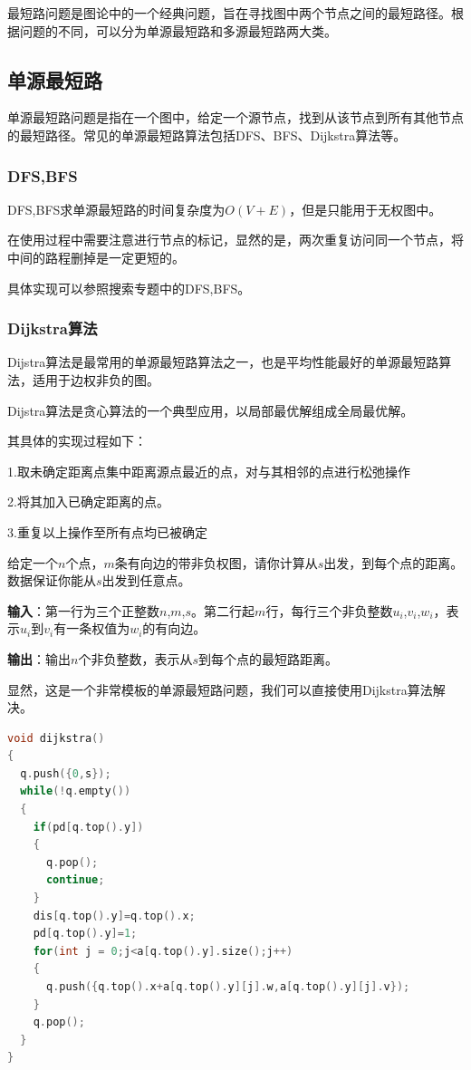 \documentclass{article}
\begin{document}
最短路问题是图论中的一个经典问题，旨在寻找图中两个节点之间的最短路径。根据问题的不同，可以分为单源最短路和多源最短路两大类。

\subsection{单源最短路}

单源最短路问题是指在一个图中，给定一个源节点，找到从该节点到所有其他节点的最短路径。常见的单源最短路算法包括DFS、BFS、Dijkstra算法等。

\subsubsection{DFS,BFS}

DFS,BFS求单源最短路的时间复杂度为$O(V+E)$，但是只能用于无权图中。

在使用过程中需要注意进行节点的标记，显然的是，两次重复访问同一个节点，将中间的路程删掉是一定更短的。

具体实现可以参照搜索专题中的DFS,BFS。

\subsubsection{Dijkstra算法}

Dijstra算法是最常用的单源最短路算法之一，也是平均性能最好的单源最短路算法，适用于边权非负的图。

Dijstra算法是贪心算法的一个典型应用，以局部最优解组成全局最优解。

其具体的实现过程如下：

1.取未确定距离点集中距离源点最近的点，对与其相邻的点进行松弛操作

2.将其加入已确定距离的点。

3.重复以上操作至所有点均已被确定

\begin{example}
  给定一个$n$个点，$m$条有向边的带非负权图，请你计算从$s$出发，到每个点的距离。数据保证你能从$s$出发到任意点。

  \textbf{输入}：第一行为三个正整数$n$,$m$,$s$。第二行起$m$行，每行三个非负整数$u_i$,$v_i$,$w_i$，表示$u_i$到$v_i$有一条权值为$w_i$的有向边。

  \textbf{输出}：输出$n$个非负整数，表示从$s$到每个点的最短路距离。

\end{example}

\begin{soln}

  显然，这是一个非常模板的单源最短路问题，我们可以直接使用Dijkstra算法解决。

      \begin{lstlisting}[language=C++]
void dijkstra()
{
  q.push({0,s});
  while(!q.empty())
  {
    if(pd[q.top().y])
    {
      q.pop();
      continue;
    }
    dis[q.top().y]=q.top().x;
    pd[q.top().y]=1;
    for(int j = 0;j<a[q.top().y].size();j++)
    {
      q.push({q.top().x+a[q.top().y][j].w,a[q.top().y][j].v});
    }
    q.pop();
  }
}
    \end{lstlisting}

\end{soln}
\end{document}
